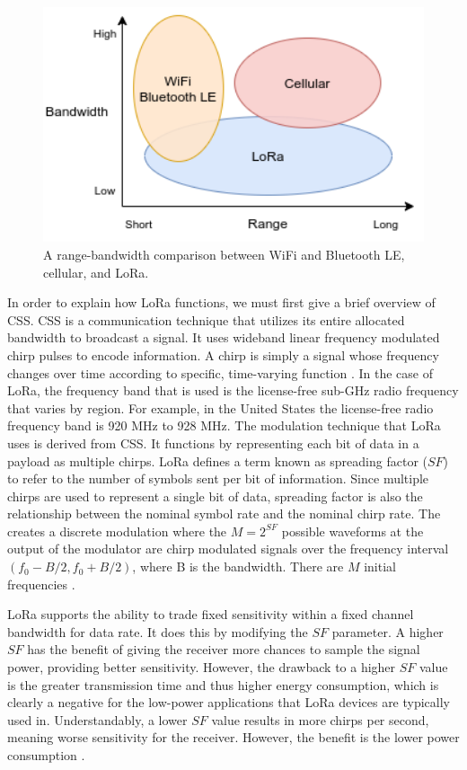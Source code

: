 \begin{figure}
    \centering
    \includegraphics[width=6in]{figures/lora-bandwidth.png}
    \caption{A range-bandwidth comparison between WiFi and Bluetooth LE, cellular, and LoRa.}
    \label{fig:lora-range-bandwidth}
\end{figure}


In order to explain how LoRa functions, we must first give a brief overview of CSS. CSS is a communication technique that utilizes its entire allocated bandwidth to broadcast a signal. It uses wideband linear frequency modulated chirp pulses to encode information. A chirp is simply a signal whose frequency changes over time according to specific, time-varying function \cite{ieee-std-chirp}. In the case of LoRa, the frequency band that is used is the license-free sub-GHz radio frequency that varies by region. For example, in the United States the license-free radio frequency band is 920 MHz to 928 MHz. The modulation technique that LoRa uses is derived from CSS. It functions by representing each bit of data in a payload as multiple chirps. LoRa defines a term known as spreading factor ($SF$) to refer to the number of symbols sent per bit of information. Since multiple chirps are used to represent a single bit of data, spreading factor is also the relationship between the nominal symbol rate and the nominal chirp rate. The creates a discrete modulation where the $M=2^{SF}$ possible waveforms at the output of the modulator are chirp modulated signals over the frequency interval $(f_0 - B/2, f_0 + B/2)$, where B is the bandwidth. There are $M$ initial frequencies \cite{ieee-lora-modulation}.

LoRa supports the ability to trade fixed sensitivity within a fixed channel bandwidth for data rate. It does this by modifying the $SF$ parameter. A higher $SF$ has the benefit of giving the receiver more chances to sample the signal power, providing better sensitivity. However, the drawback to a higher $SF$ value is the greater transmission time and thus higher energy consumption, which is clearly a negative for the low-power applications that LoRa devices are typically used in. Understandably, a lower $SF$ value results in more chirps per second, meaning worse sensitivity for the receiver. However, the benefit is the lower power consumption \cite{ttn-spreading-factor}.

